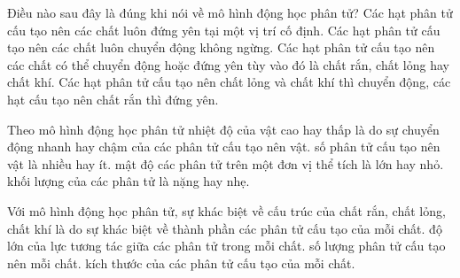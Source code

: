


\begin{ex}
Điều nào sau đây là đúng khi nói về mô hình động học phân tử?
\choice
{Các hạt phân tử cấu tạo nên các chất luôn đứng yên tại một vị trí cố định.}
{\True Các hạt phân tử cấu tạo nên các chất luôn chuyển động không ngừng.}
{Các hạt phân tử cấu tạo nên các chất có thể chuyển động hoặc đứng yên tùy vào đó là chất rắn, chất lỏng hay chất khí.}
{Các hạt phân tử cấu tạo nên chất lỏng và chất khí thì chuyển động, các hạt cấu tạo nên chất rắn thì đứng yên.}
\end{ex}

\begin{ex}
Theo mô hình động học phân tử nhiệt độ của vật cao hay thấp là do
\choice
{\True sự chuyển động nhanh hay chậm của các phân tử cấu tạo nên vật.}
{số phân tử cấu tạo nên vật là nhiều hay ít.}
{mật độ các phân tử trên một đơn vị thể tích là lớn hay nhỏ.}
{khối lượng của các phân tử là nặng hay nhẹ.}
\end{ex}


\begin{ex}
Với mô hình động học phân tử, sự khác biệt về cấu trúc của chất rắn, chất lỏng, chất khí là do sự khác biệt về
\choice
{thành phần các phân tử cấu tạo của mỗi chất.}
{\True độ lớn của lực tương tác giữa các phân tử trong mỗi chất.}
{số lượng phân tử cấu tạo nên mỗi chất.}
{kích thước của các phân tử cấu tạo của mỗi chất.}
\end{ex}


